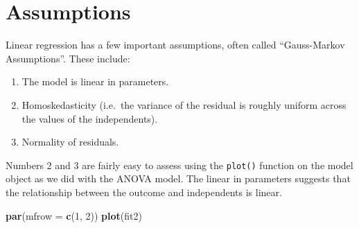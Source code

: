 \documentclass[]{tufte-book}
\newenvironment{Shaded}{}{}
\newcommand{\KeywordTok}[1]{\textcolor[rgb]{0.00,0.44,0.13}{\textbf{#1}}}
\newcommand{\DataTypeTok}[1]{\textcolor[rgb]{0.56,0.13,0.00}{#1}}
\newcommand{\DecValTok}[1]{\textcolor[rgb]{0.25,0.63,0.44}{#1}}
\newcommand{\NormalTok}[1]{#1}
\providecommand{\tightlist}{%
  \setlength{\itemsep}{0pt}\setlength{\parskip}{0pt}}
\theoremstyle{definition}
\theoremstyle{definition}
\theoremstyle{remark}
\begin{document}
\section*{Assumptions}\label{assumptions-1}

Linear regression has a few important assumptions, often called
``Gauss-Markov Assumptions''. These include:

\begin{enumerate}
\def\labelenumi{\arabic{enumi}.}
\tightlist
\item
  The model is linear in parameters.
\item
  Homoskedasticity (i.e.~the variance of the residual is roughly uniform
  across the values of the independents).
\item
  Normality of residuals.
\end{enumerate}

Numbers 2 and 3 are fairly easy to assess using the \texttt{plot()}
function on the model object as we did with the ANOVA model. The linear
in parameters suggests that the relationship between the outcome and
independents is linear.

\begin{Shaded}
\begin{Highlighting}[]
\KeywordTok{par}\NormalTok{(}\DataTypeTok{mfrow =} \KeywordTok{c}\NormalTok{(}\DecValTok{1}\NormalTok{, }\DecValTok{2}\NormalTok{))}
\KeywordTok{plot}\NormalTok{(fit2)}
\end{Highlighting}
\end{Shaded}
\end{document}
